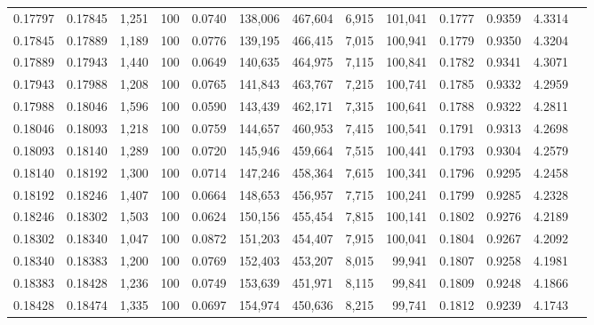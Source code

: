 \begin{tabular}{rrrrrrrrrrrrr}
0.17797 & 0.17845 & 1,251 & 100 &                                     0.0740 & 138,006 & 467,604 &   6,915 & 101,041 & 0.1777 & 0.9359 & 4.3314 \\
0.17845 & 0.17889 & 1,189 & 100 &                                     0.0776 & 139,195 & 466,415 &   7,015 & 100,941 & 0.1779 & 0.9350 & 4.3204 \\
0.17889 & 0.17943 & 1,440 & 100 &                                     0.0649 & 140,635 & 464,975 &   7,115 & 100,841 & 0.1782 & 0.9341 & 4.3071 \\
0.17943 & 0.17988 & 1,208 & 100 &                                     0.0765 & 141,843 & 463,767 &   7,215 & 100,741 & 0.1785 & 0.9332 & 4.2959 \\
0.17988 & 0.18046 & 1,596 & 100 &                                     0.0590 & 143,439 & 462,171 &   7,315 & 100,641 & 0.1788 & 0.9322 & 4.2811 \\
0.18046 & 0.18093 & 1,218 & 100 &                                     0.0759 & 144,657 & 460,953 &   7,415 & 100,541 & 0.1791 & 0.9313 & 4.2698 \\
0.18093 & 0.18140 & 1,289 & 100 &                                     0.0720 & 145,946 & 459,664 &   7,515 & 100,441 & 0.1793 & 0.9304 & 4.2579 \\
0.18140 & 0.18192 & 1,300 & 100 &                                     0.0714 & 147,246 & 458,364 &   7,615 & 100,341 & 0.1796 & 0.9295 & 4.2458 \\
0.18192 & 0.18246 & 1,407 & 100 &                                     0.0664 & 148,653 & 456,957 &   7,715 & 100,241 & 0.1799 & 0.9285 & 4.2328 \\
0.18246 & 0.18302 & 1,503 & 100 &                                     0.0624 & 150,156 & 455,454 &   7,815 & 100,141 & 0.1802 & 0.9276 & 4.2189 \\
0.18302 & 0.18340 & 1,047 & 100 &                                     0.0872 & 151,203 & 454,407 &   7,915 & 100,041 & 0.1804 & 0.9267 & 4.2092 \\
0.18340 & 0.18383 & 1,200 & 100 &                                     0.0769 & 152,403 & 453,207 &   8,015 &  99,941 & 0.1807 & 0.9258 & 4.1981 \\
0.18383 & 0.18428 & 1,236 & 100 &                                     0.0749 & 153,639 & 451,971 &   8,115 &  99,841 & 0.1809 & 0.9248 & 4.1866 \\
0.18428 & 0.18474 & 1,335 & 100 &                                     0.0697 & 154,974 & 450,636 &   8,215 &  99,741 & 0.1812 & 0.9239 & 4.1743 \\

\end{tabular}
